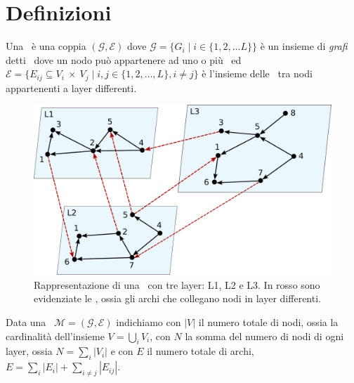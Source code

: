 \chapter{Definizioni}

\begin{definizione} 
    \label{def:muln}
    Una \muln\ è una coppia $(\mathcal{G}, \mathcal{E} )$ dove
    $\mathcal{G} = \{G_i \mid i \in \{1, 2, \dots L\}\}$ è un insieme di \textit{grafi} 
    detti \layers\ dove un nodo può appartenere ad uno o più \layers\ ed 
    $\mathcal{E} = \{E_{ij} \subseteq V_i~\times~V_j \mid i,j \in \{1, 2, \dots, L\}, i \neq j\}$
    è l'insieme delle \interc\ tra nodi appartenenti a layer differenti.
\end{definizione}
%     
\begin{figure}
    \centering
    \includegraphics[height=0.3\textheight]{img/mlexample1.pdf}
    \caption{Rappresentazione di una \muln\ con tre layer: L1, L2 e L3.
    In rosso sono evidenziate le \interc, ossia gli archi che collegano nodi in 
    layer differenti.}
    \label{fig:mlexample}
\end{figure}

\begin{definizione}
    Data una \muln\ $\mathcal{M}=(\mathcal{G}, \mathcal{E})$ 
    indichiamo con $|V|$ il numero totale di nodi, ossia la cardinalità dell'insieme $V = \bigcup\limits_{i} V_i$,
    con $N$ la somma del numero di nodi di ogni layer, ossia $N = \sum_{i}{|V_i|}$
    e con $E$ il numero totale di archi, $E = \sum_{i} |E_i| + \sum_{i \neq j} |E_{ij}|$.    
\end{definizione}

